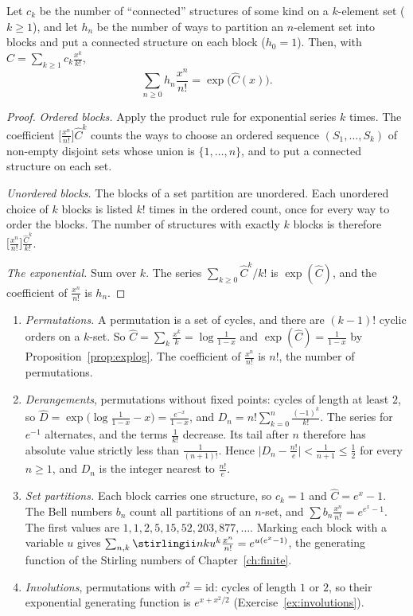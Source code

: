 \begin{theorem}\label{thm:expformula}
Let $c_k$ be the number of ``connected'' structures of some kind on a $k$-element set ($k\ge1$), and let $h_n$ be the
number of ways to partition an $n$-element set into blocks and put a connected structure on each block ($h_0=1$).
Then, with $\hat C=\sum_{k\ge1}c_k\frac{x^k}{k!}$,
\[
\sum_{n\ge0}h_n\frac{x^n}{n!}=\exp\bigl(\hat C(x)\bigr).
\]
\end{theorem}
\begin{proof}
\emph{Ordered blocks.}
Apply the product rule for exponential series $k$ times. The coefficient $\bigl[\frac{x^n}{n!}\bigr]\hat C^k$ counts the ways to choose an ordered sequence $(S_1,\dots,S_k)$ of non-empty disjoint sets whose union is $\{1,\dots,n\}$, and to put a connected structure on each set.

\emph{Unordered blocks.}
The blocks of a set partition are unordered. Each unordered choice of $k$ blocks is listed $k!$ times in the ordered count, once for every way to order the blocks. The number of structures with exactly $k$ blocks is therefore $\bigl[\frac{x^n}{n!}\bigr]\frac{\hat C^k}{k!}$.

\emph{The exponential.}
Sum over $k$. The series $\sum_{k\ge0}\hat C^k/k!$ is $\exp(\hat C)$, and the coefficient of $\frac{x^n}{n!}$ is $h_n$.
\end{proof}

\begin{example}\label{ex:expformula}
\begin{enumerate}[label=(\alph*)]
\item \emph{Permutations.} A permutation is a set of cycles, and there are $(k-1)!$ cyclic orders on a $k$-set. So
$\hat C=\sum_k\frac{x^k}k=\log\frac1{1-x}$ and $\exp(\hat C)=\frac1{1-x}$ by Proposition~\ref{prop:explog}. The coefficient of $\frac{x^n}{n!}$ is $n!$, the number of permutations.
\item \emph{Derangements}, permutations without fixed points: cycles of length at least $2$, so
$\hat D=\exp\bigl(\log\frac1{1-x}-x\bigr)=\frac{e^{-x}}{1-x}$, and $D_n=n!\sum_{k=0}^n\frac{(-1)^k}{k!}$. The series for $e^{-1}$ alternates, and the terms $\frac1{k!}$ decrease. Its tail after $n$ therefore has absolute value strictly less than $\frac1{(n+1)!}$. Hence $\bigl|D_n-\frac{n!}e\bigr|<\frac1{n+1}\le\frac12$ for every $n\ge1$, and $D_n$ is the integer nearest to $\frac{n!}e$.
\item \emph{Set partitions.} Each block carries one structure, so $c_k=1$ and $\hat C=e^x-1$. The Bell numbers $b_n$ count all partitions of an $n$-set, and $\sum b_n\frac{x^n}{n!}=e^{e^x-1}$. The first values are $1,1,2,5,15,52,203,877,\dots$.
Marking each block with a variable $u$ gives $\sum_{n,k}\stirlingii nk u^k\frac{x^n}{n!}=e^{u(e^x-1)}$, the generating
function of the Stirling numbers of Chapter~\ref{ch:finite}.
\item \emph{Involutions}, permutations with $\sigma^2=\mathrm{id}$: cycles of length $1$ or $2$, so their exponential
generating function is $e^{x+x^2/2}$ (Exercise~\ref{ex:involutions}).
\end{enumerate}
\end{example}

